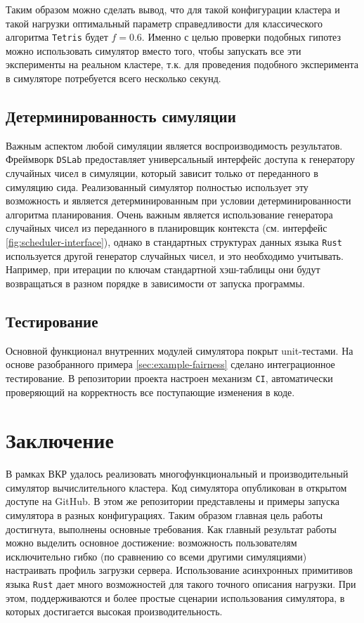 Таким образом можно сделать вывод, что для такой конфигурации кластера и такой нагрузки оптимальный параметр справедливости для классического алгоритма \texttt{Tetris} будет $f = 0.6$. Именно с целью проверки подобных гипотез можно использовать симулятор вместо того, чтобы запускать все эти эксперименты на реальном кластере, т.к. для проведения подобного эксперимента в симуляторе потребуется всего несколько секунд. 

\subsection{Детерминированность симуляции}

Важным аспектом любой симуляции является воспроизводимость результатов. Фреймворк \texttt{DSLab} предоставляет универсальный интерфейс доступа к генератору случайных чисел в симуляции, который зависит только от переданного в симуляцию сида. Реализованный симулятор полностью использует эту возможность и является детерминированным при условии детерминированности алгоритма планирования. Очень важным является использование генератора случайных чисел из переданного в планировщик контекста (см. интерфейс \ref{fig:scheduler-interface}), однако в стандартных структурах данных языка \texttt{Rust} используется другой генератор случайных чисел, и это необходимо учитывать. Например, при итерации по ключам стандартной хэш-таблицы они будут возвращаться в разном порядке в зависимости от запуска программы.

\subsection{Тестирование}

Основной функционал внутренних модулей симулятора покрыт unit-тестами. На основе разобранного примера \ref{sec:example-fairness} сделано интеграционное тестирование. В репозитории проекта настроен механизм \texttt{CI}, автоматически проверяющий на корректность все поступающие изменения в коде. 

\section{Заключение}\label{sec:conclusion}

В рамках ВКР удалось реализовать многофункциональный и производительный симулятор вычислительного кластера. Код симулятора опубликован в открытом доступе на GitHub\cite{dslab-cluster-scheduling-repo}. В этом же репозитории представлены и примеры запуска симулятора в разных конфигурациях. Таким образом главная цель работы достигнута, выполнены основные требования. Как главный результат работы можно выделить основное достижение: возможность пользователям исключительно гибко (по сравнению со всеми другими симуляциями) настраивать профиль загрузки сервера. Использование асинхронных примитивов языка \texttt{Rust} дает много возможностей для такого точного описания нагрузки. При этом, поддерживаются и более простые сценарии использования симулятора, в которых достигается высокая производительность.

